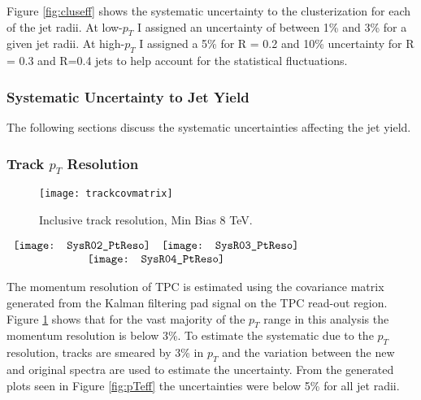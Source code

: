 Figure \ref{fig:cluseff} shows the systematic uncertainty to the clusterization for each of the jet radii.  At low-$p_{T}$ I assigned an uncertainty of between 1\% and 3\% for a given jet radii.  At high-$p_{T}$ I assigned a 5\% for R = 0.2 and 10\% uncertainty for R = 0.3 and R=0.4 jets to help account for the statistical fluctuations.

\subsubsection{Systematic Uncertainty to Jet Yield}

The following sections discuss the systematic uncertainties affecting the jet yield.

\subsubsection{Track $p_{T}$ Resolution}

\begin{figure}[h]
\texttt{[image: trackcovmatrix]}
\centering
\caption{Inclusive track resolution, Min Bias 8 TeV.}
\label{fig:trackpcovmatrix}
\end{figure}

\begin{figure*}[t!]
$\begin{array}{rl}
    \texttt{[image: SysR02\_PtReso]} &
    \texttt{[image: SysR03\_PtReso]}\\
    \multicolumn{2}{c}{\texttt{[image: SysR04\_PtReso]}}
\end{array}$
\caption[Systematic due to $P_{T}$ resolution.]{\label{fig:pTeff}$P_{T}$ resolution systematic; R = 0.2 \textit{(top left)}, R = 0.3 \textit{(top right)}, R = 0.4 \textit{(bottom)}.}
\end{figure*}

\noindent
The momentum resolution of TPC is estimated using the covariance matrix generated from the Kalman filtering\cite{Fruhwirth:1987fm} pad signal on the TPC read-out region.  Figure \ref{fig:trackpcovmatrix} shows that for the vast majority of the $p_{T}$ range in this analysis the  momentum resolution is below 3\%.  To estimate the systematic due to the $p_{T}$ resolution, tracks are smeared by 3\% in $p_{T}$ and the variation between the new and original spectra are used to estimate the uncertainty.  From the generated plots seen in Figure \ref{fig:pTeff} the uncertainties were below 5\% for all jet radii.

